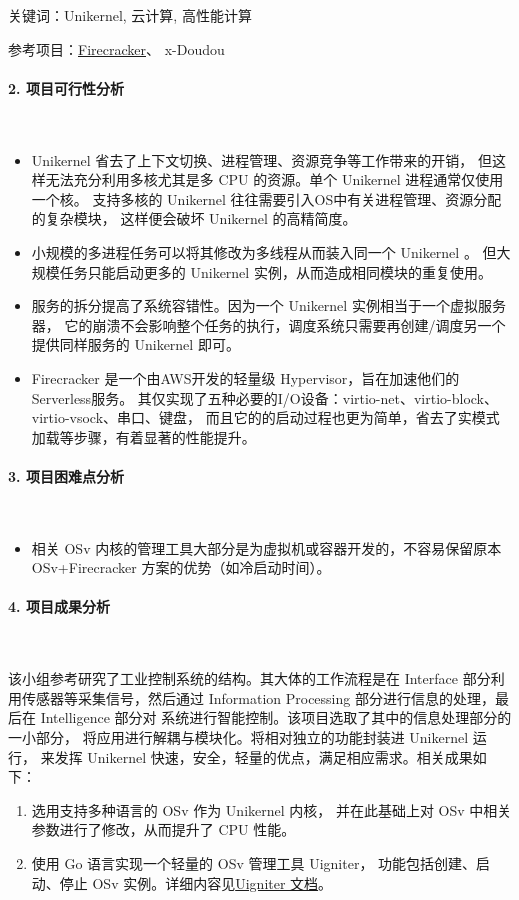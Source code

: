 \documentclass[UTF8,fontset=none,linespread=1.15]{ctexart}
\begin{document}
关键词：Unikernel, 云计算, 高性能计算

参考项目：\href{https://github.com/firecracker-microvm/firecracker}{Firecracker}、
 x-Doudou

\paragraph{2. 项目可行性分析}~\par

\begin{itemize}
\item Unikernel 省去了上下文切换、进程管理、资源竞争等工作带来的开销，
但这样无法充分利用多核尤其是多 CPU 的资源。单个 Unikernel 进程通常仅使用一个核。
支持多核的 Unikernel 往往需要引入OS中有关进程管理、资源分配的复杂模块，
这样便会破坏 Unikernel 的高精简度。
\item 小规模的多进程任务可以将其修改为多线程从而装入同一个 Unikernel 。
但大规模任务只能启动更多的 Unikernel 实例，从而造成相同模块的重复使用。
\item 服务的拆分提高了系统容错性。因为一个 Unikernel 实例相当于一个虚拟服务器，
它的崩溃不会影响整个任务的执行，调度系统只需要再创建/调度另一个提供同样服务的 Unikernel 即可。
\item Firecracker 是一个由AWS开发的轻量级 Hypervisor，旨在加速他们的Serverless服务。
其仅实现了五种必要的I/O设备：virtio-net、virtio-block、virtio-vsock、串口、键盘，
而且它的的启动过程也更为简单，省去了实模式加载等步骤，有着显著的性能提升。
\end{itemize}

\paragraph{3. 项目困难点分析}~\par
\begin{itemize}
\item 相关 OSv 内核的管理工具大部分是为虚拟机或容器开发的，不容易保留原本
OSv+Firecracker 方案的优势（如冷启动时间）。
\end{itemize}

\paragraph{4. 项目成果分析}~\par

该小组参考研究了工业控制系统的结构。其大体的工作流程是在
Interface 部分利用传感器等采集信号，然后通过 Information
Processing 部分进行信息的处理，最后在 Intelligence 部分对
系统进行智能控制。该项目选取了其中的信息处理部分的一小部分，
将应用进行解耦与模块化。将相对独立的功能封装进 Unikernel 运行，
来发挥 Unikernel 快速，安全，轻量的优点，满足相应需求。相关成果如下：
\begin{enumerate}
\item  选用支持多种语言的 OSv 作为 Unikernel 内核，
并在此基础上对 OSv 中相关参数进行了修改，从而提升了 CPU 性能。
\item 使用 Go 语言实现一个轻量的 OSv 管理工具 Uigniter，
功能包括创建、启动、停止 OSv 实例。详细内容见\href{https://github.com/richardlee159/uigniter/tree/e1c063341d658ec897a029b30874bc01bb852a1a}{Uigniter 文档}。
\end{enumerate}
\end{document}
